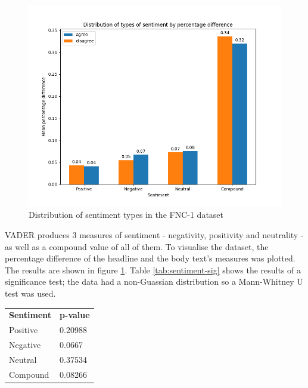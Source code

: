 \begin{figure}
	\centering
	\includegraphics[width=0.8\linewidth]{images/plots/sentiment-analysis.png}
	\caption{Distribution of sentiment types in the FNC-1 dataset}\label{plot:sentiment-analysis}
\end{figure}

\vspace{5mm}

\hspace{-6mm}\begin{minipage}{0.65\linewidth}
VADER produces 3 measures of sentiment - negativity, positivity and neutrality - as well as a compound value of all of them. To visualise the dataset, the percentage difference of the headline and the body text's measures was plotted. The results are shown in figure \ref{plot:sentiment-analysis}. Table \ref{tab:sentiment-sig} shows the results of a significance test; the data had a non-Guassian distribution so a Mann-Whitney U test was used.\\
\end{minipage}
\hspace{5mm}
\begin{minipage}{0.3\linewidth}
\vspace{-12mm}
\begin{tabular}{ll}
\textbf{Sentiment} & \textbf{p-value} \\
Positive           & 0.20988          \\
Negative           & 0.0667           \\
Neutral            & 0.37534          \\
Compound           & 0.08266         
\end{tabular}
\label{tab:sentiment-sig}
\end{minipage}


